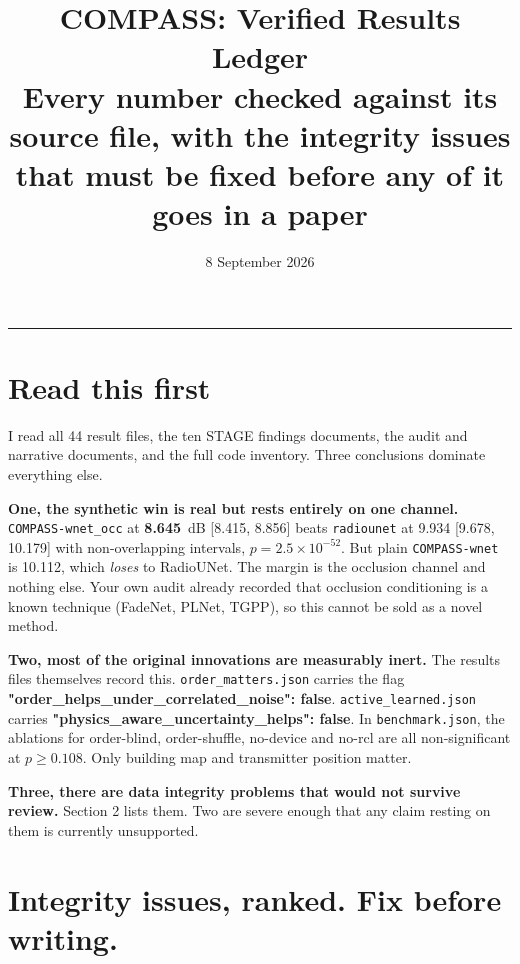 \documentclass[10pt,a4paper]{article}
\title{\vspace{-1.4cm}\textbf{COMPASS: Verified Results Ledger}\\[1.5mm]
\large Every number checked against its source file, with the integrity issues\\that must be fixed before any of it goes in a paper}
\date{8 September 2026}
\author{}
\newcommand{\B}[1]{\textcolor{bad}{\textbf{#1}}}
\newcommand{\G}[1]{\textcolor{good}{\textbf{#1}}}
\begin{document}
\maketitle\vspace{-9mm}\hrule\vspace{3mm}

\section{Read this first}

I read all 44 result files, the ten STAGE findings documents, the audit and narrative
documents, and the full code inventory. Three conclusions dominate everything else.

\textbf{One, the synthetic win is real but rests entirely on one channel.}
\texttt{COMPASS-wnet\_occ} at \G{8.645}~dB [8.415, 8.856] beats \texttt{radiounet} at
9.934 [9.678, 10.179] with non-overlapping intervals, $p=2.5\!\times\!10^{-52}$. But
plain \texttt{COMPASS-wnet} is 10.112, which \emph{loses} to RadioUNet. The margin is
the occlusion channel and nothing else. Your own audit already recorded that occlusion
conditioning is a known technique (FadeNet, PLNet, TGPP), so this cannot be sold as a
novel method.

\textbf{Two, most of the original innovations are measurably inert.} The results files
themselves record this. \texttt{order\_matters.json} carries the flag
\B{"order\_helps\_under\_correlated\_noise": false}. \texttt{active\_learned.json}
carries \B{"physics\_aware\_uncertainty\_helps": false}. In
\texttt{benchmark.json}, the ablations for order-blind, order-shuffle, no-device and
no-rcl are all non-significant at $p\ge0.108$. Only building map and transmitter
position matter.

\textbf{Three, there are data integrity problems that would not survive review.}
Section 2 lists them. Two are severe enough that any claim resting on them is currently
unsupported.

\section{Integrity issues, ranked. Fix before writing.}
\end{document}
